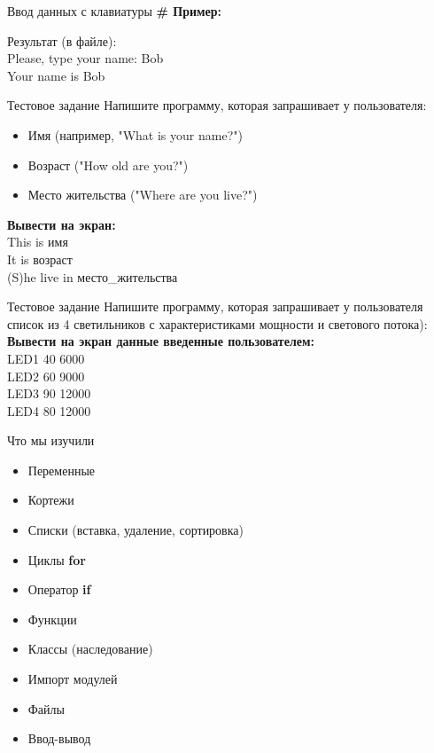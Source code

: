 \documentclass[12pt]{beamer}
\begin{document}
\begin{frame}{Ввод данных с клавиатуры}
\textbf{\# Пример:} 
\vspace{0.5cm}

\vspace{0.5cm}
Результат (в файле): \\
Please, type your name: Bob \\
Your name is Bob \\
\end{frame}


\begin{frame}{Тестовое задание}
Напишите программу, которая запрашивает у пользователя:
\begin{itemize}
\item Имя (например, "What is your name?")
\item Возраст ("How old are you?")
\item Место жительства ("Where are you live?")
\end{itemize}
\vspace{0.3cm}
\textbf{Вывести на экран:} \\
This is имя \\
It is возраст \\
(S)he live in место\_жительства \\ 
\end{frame}


\begin{frame}{Тестовое задание}
Напишите программу, которая запрашивает у пользователя список из 4 светильников с характеристиками мощности и светового потока): \\
\vspace{0.3cm}
\textbf{Вывести на экран данные введенные пользователем:} \\
LED1  40  6000 \\
LED2 60  9000 \\
LED3 90 12000 \\
LED4 80 12000 \\
\end{frame}


\begin{frame}{Что мы изучили}
\begin{itemize}
\item Переменные 
\item Кортежи
\item Списки (вставка, удаление, сортировка)
\item Циклы \textbf{for}
\item Оператор \textbf{if}
\item Функции
\item Классы (наследование)
\item Импорт модулей
\item Файлы
\item Ввод-вывод 
\end{itemize}
\end{frame}
\end{document}
